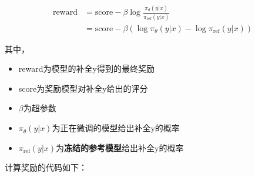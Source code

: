 \documentclass[lang=cn,newtx,10pt,scheme=chinese]{elegantbook}
\begin{document}
\begin{equation}
\begin{aligned}
\text{reward}&=\text{score}-\beta\log\frac{\pi_\theta(y|x)}{\pi_\text{ref}(y|x)} \\
&=\text{score}-\beta\left( \log\pi_\theta(y|x)-\log\pi_\text{ref}(y|x) \right)
\end{aligned}
\end{equation}

其中，

\begin{itemize}
    \item reward为模型的补全y得到的最终奖励
    \item score为奖励模型对补全y给出的评分
    \item $\beta$为超参数
    \item $\pi_\theta(y|x)$为正在微调的模型给出补全y的概率
    \item $\pi_\text{ref}(y|x)$为\textbf{冻结的参考模型}给出补全y的概率
\end{itemize}

计算奖励的代码如下：
\end{document}
